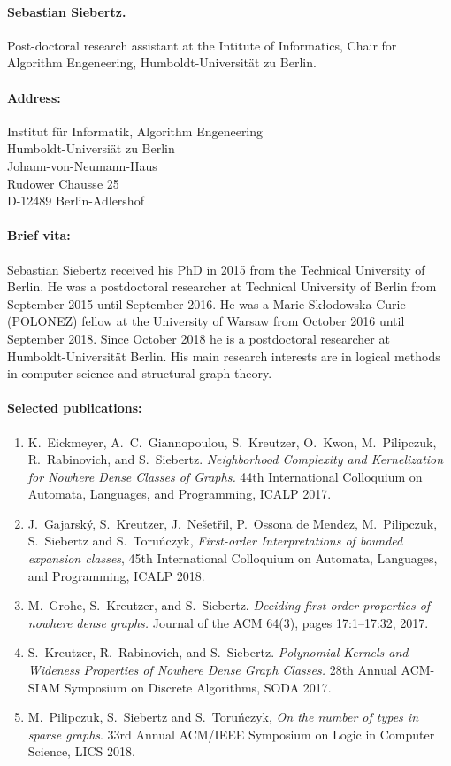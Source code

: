 \paragraph{Sebastian Siebertz.}
Post-doctoral research assistant at the Intitute of Informatics, Chair for Algorithm Engeneering, Humboldt-Universit\"at zu Berlin. 

\paragraph{Address:}

 Institut f\"ur Informatik, Algorithm Engeneering\\
Humboldt-Universi\"at zu Berlin\\
Johann-von-Neumann-Haus\\
Rudower Chausse 25\\
D-12489 Berlin-Adlershof\\


\paragraph{Brief vita:}
Sebastian Siebertz received his PhD in 2015 from the Technical 
University of Berlin. He was a postdoctoral researcher at
Technical University of Berlin from September 2015 until 
September 2016. He was 
a Marie Skłodowska-Curie (POLONEZ) fellow at the University
of Warsaw from October 2016 until September 2018. Since
October 2018 he is a postdoctoral researcher at Humboldt-Universit\"at Berlin. 
His main research interests are in logical methods in computer 
science and structural graph theory. 

\paragraph{Selected publications:}
\begin{enumerate}
\item K.\ Eickmeyer, A.\ C.\ Giannopoulou, S.\ Kreutzer,
O.\ Kwon, M.\ Pilipczuk, R.\ Rabinovich, and S.\ Siebertz. 
\emph{Neighborhood Complexity and Kernelization for Nowhere Dense Classes of Graphs.} 44th International Colloquium on Automata, Languages, and Programming, {ICALP} 2017. 
\item J.~Gajarsk{\'{y}}, S.~Kreutzer, J.~Ne{\v s}et{\v r}il, P.~Ossona de Mendez, M.~Pilipczuk, S.~Siebertz and S.~Toru{\'{n}}czyk, \emph{First-order Interpretations of bounded expansion classes}, 
45th International Colloquium on Automata, Languages, and Programming, ICALP 2018. 
\item  M.\ Grohe, S.\ Kreutzer, and S.\ Siebertz. \emph{Deciding first-order properties of nowhere dense graphs.} Journal of the ACM 64(3), pages 17:1--17:32, 2017. 
\item S.\ Kreutzer, R.\ Rabinovich, and S.\ Siebertz. \emph{Polynomial Kernels and Wideness Properties of Nowhere Dense Graph Classes.} 28th Annual ACM-SIAM Symposium on Discrete Algorithms, SODA 2017. 
\item M.~Pilipczuk, S.~Siebertz and S.~Toru\'nczyk, \emph{On the number of types in sparse graphs}. 
33rd Annual ACM/IEEE Symposium on Logic in Computer Science, LICS 2018. 
\end{enumerate}

